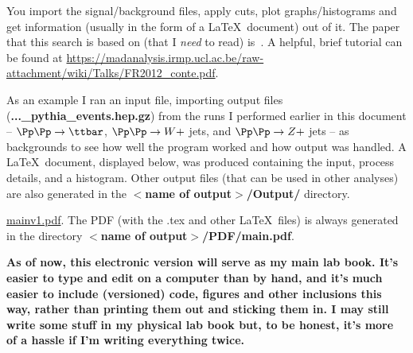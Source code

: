 You import the signal/background files, apply cuts, plot graphs/histograms and get information (usually in the form of a \LaTeX\ document) out of it. The paper that this search is based on (that I \emph{need} to read) is~\cite{ATLAS-CONF-2016-019}. A helpful, brief tutorial can be found at \url{https://madanalysis.irmp.ucl.ac.be/raw-attachment/wiki/Talks/FR2012_conte.pdf}.

As an example I ran an input file, importing \madgraph output files (\textbf{...\_pythia\_events.hep.gz}) from the runs I performed earlier in this document -- $\Pp\Pp \rightarrow \ttbar$, $\Pp\Pp \rightarrow W +$ jets, and $\Pp\Pp \rightarrow Z +$ jets -- as backgrounds to see how well the program worked and how output was handled. A \LaTeX\ document, displayed below, was produced containing the input, process details, and a histogram. Other output files (that can be used in other analyses) are also generated in the \textbf{$<$name of output$>$/Output/} directory.

\href{run:modules/Sec 13 - Using MadAnalysis and searching for dark matter/figures/mainv1.pdf}{mainv1.pdf}. The PDF (with the .tex and other \LaTeX\ files) is always generated in the directory \textbf{$<$name of output$>$/PDF/main.pdf}.

\textbf{As of now, this electronic version will serve as my main lab book. It's easier to type and edit on a computer than by hand, and it's much easier to include (versioned) code, figures and other inclusions this way, rather than printing them out and sticking them in. I may still write some stuff in my physical lab book but, to be honest, it's more of a hassle if I'm writing everything twice.}
